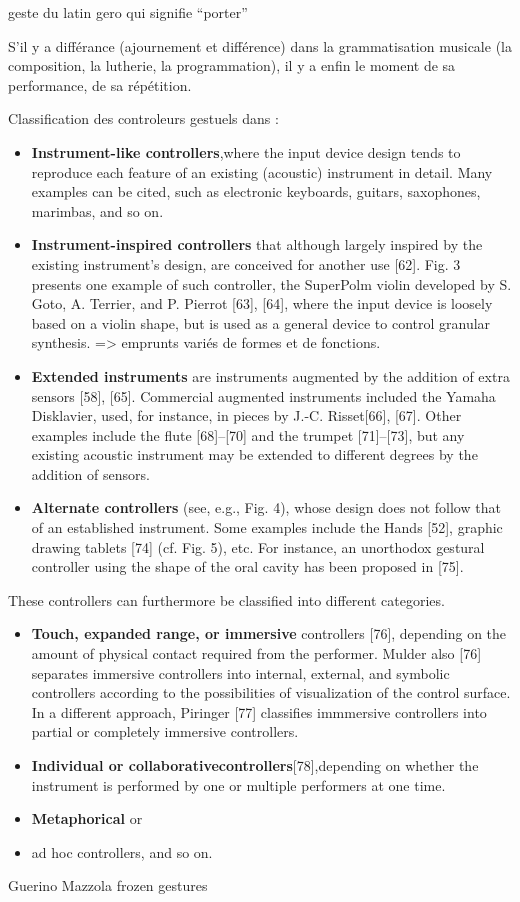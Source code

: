 geste du latin gero qui signifie ``porter''

S'il y a différance (ajournement et différence) dans la grammatisation musicale (la composition, la lutherie, la programmation), il y a enfin le moment de sa performance, de sa répétition.

Classification des controleurs gestuels dans \cite{wanderley_controgestuel_1999}:
\vspace{-1em}
\begin{itemize}[noitemsep]
\item \textbf{Instrument-like controllers},where the input device design tends to reproduce each feature of an existing (acoustic) instrument in detail. Many examples can be cited, such as electronic keyboards, guitars, saxophones, marimbas, and so on.
\item \textbf{Instrument-inspired controllers} that although largely inspired by the existing instrument’s design, are conceived for another use [62]. Fig. 3 presents one example of such controller, the SuperPolm violin developed by S. Goto, A. Terrier, and P. Pierrot [63], [64], where the input device is loosely based on a violin shape, but is used as a general device to control granular synthesis. => emprunts variés de formes et de fonctions.
\item \textbf{Extended instruments} are instruments augmented by the addition of extra sensors [58], [65]. Commercial augmented instruments included the Yamaha Disklavier, used, for instance, in pieces by J.-C. Risset[66], [67]. Other examples include the flute [68]–[70] and the trumpet [71]–[73], but any existing acoustic instrument may be extended to different degrees by the addition of sensors.
\item \textbf{Alternate controllers} (see, e.g., Fig. 4), whose design does not follow that of an established instrument. Some examples include the Hands [52], graphic drawing tablets [74] (cf. Fig. 5), etc. For instance, an unorthodox gestural controller using the shape of the oral cavity has been proposed in [75].
\end{itemize}

These controllers can furthermore be classified into different categories.
\begin{itemize}[noitemsep]
\item \textbf{Touch, expanded range, or immersive} controllers [76], depending on the amount of physical contact required from the performer. Mulder also [76] separates immersive controllers into internal, external, and symbolic controllers according to the possibilities of visualization of the control surface. In a different approach, Piringer [77] classifies immmersive controllers into partial or completely immersive controllers.
\item \textbf{Individual or collaborativecontrollers}[78],depending on whether the instrument is performed by one or multiple performers at one time.
\item \textbf{Metaphorical} or \item{ad hoc} controllers, and so on.
\end{itemize}


Guerino Mazzola frozen gestures

